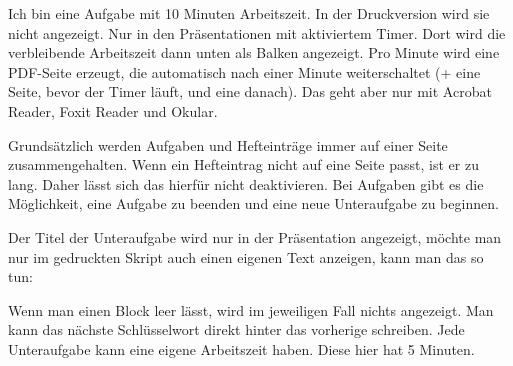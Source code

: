 {
    Ich bin eine Aufgabe mit 10 Minuten Arbeitszeit. In der Druckversion wird sie nicht angezeigt. Nur in den Präsentationen mit aktiviertem Timer.  Dort wird die verbleibende Arbeitszeit dann unten als Balken angezeigt. Pro Minute wird eine PDF-Seite erzeugt, die automatisch nach einer Minute weiterschaltet (+ eine Seite, bevor der Timer läuft, und eine danach). Das geht aber nur mit Acrobat Reader, Foxit Reader und Okular. 
}

{
    Grundsätzlich werden Aufgaben und Hefteinträge immer auf einer Seite zusammengehalten. Wenn ein Hefteintrag nicht auf eine Seite passt, ist er zu lang. Daher lässt sich das hierfür nicht deaktivieren. Bei Aufgaben gibt es die Möglichkeit, eine Aufgabe zu beenden und eine neue Unteraufgabe zu beginnen. 
    
    Der Titel der Unteraufgabe wird nur in der Präsentation angezeigt, möchte man nur im gedruckten Skript auch einen eigenen Text anzeigen, kann man das so tun:

    \ifbeamer
    \else
    \fi

    Wenn man einen Block leer lässt, wird im jeweiligen Fall nichts angezeigt. Man kann das nächste Schlüsselwort direkt hinter das vorherige schreiben.
    \ifbeamer\else {} \fi
    Jede Unteraufgabe kann eine eigene Arbeitszeit haben. Diese hier hat 5 Minuten.
}